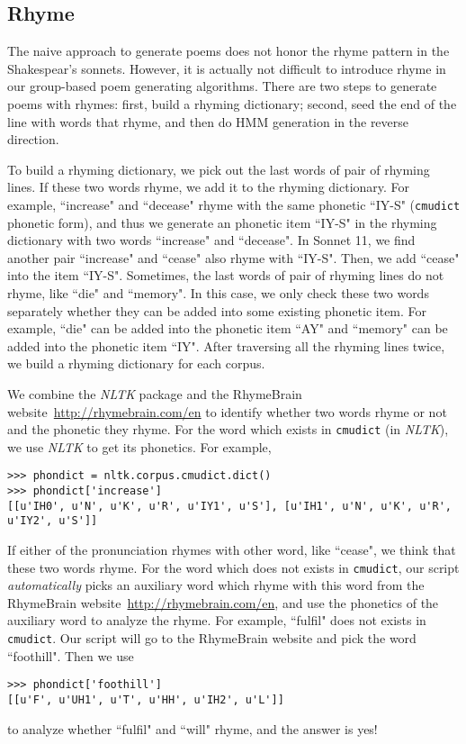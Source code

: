 %
\subsection{Rhyme}\label{sec:rhymedict}
The naive approach to generate poems does not honor the rhyme pattern in the Shakespear's sonnets. However, it is actually not difficult to introduce rhyme in our group-based poem generating algorithms. There are two steps to generate poems with rhymes: first, build a rhyming dictionary; second, seed the end of the line with words that rhyme, and then do HMM generation in the reverse direction.

To build a rhyming dictionary, we pick out the last words of pair of rhyming lines. If these two words rhyme, we add it to the rhyming dictionary. For example, ``increase" and ``decease" rhyme with the same phonetic ``IY-S" (\texttt{cmudict} phonetic form), and thus we generate an phonetic item ``IY-S" in the rhyming dictionary with two words ``increase" and ``decease". In Sonnet 11, we find another pair ``increase" and ``cease" also rhyme with ``IY-S". Then, we add ``cease" into the item ``IY-S". Sometimes, the last words of pair of rhyming lines do not rhyme, like ``die" and ``memory". In this case, we only check these two words separately whether they can be added into some existing phonetic item. For example, ``die" can be added into the phonetic item ``AY" and ``memory" can be added into the phonetic item ``IY". After traversing all the rhyming lines twice, we build a rhyming dictionary for each corpus. 

We combine the \textit{NLTK} package and the RhymeBrain website~\url{http://rhymebrain.com/en} to identify whether two words rhyme or not and the phonetic they rhyme. For the word which exists in \texttt{cmudict} (in \textit{NLTK}), we use \textit{NLTK} to get its phonetics. For example, 
\begin{lstlisting}
>>> phondict = nltk.corpus.cmudict.dict()
>>> phondict['increase']
[[u'IH0', u'N', u'K', u'R', u'IY1', u'S'], [u'IH1', u'N', u'K', u'R', u'IY2', u'S']]
\end{lstlisting}
If either of the pronunciation rhymes with other word, like ``cease", we think that these two words rhyme. For the word which does not exists in \texttt{cmudict}, our script \textit{automatically} picks an auxiliary word which rhyme with this word from the RhymeBrain website~\url{http://rhymebrain.com/en}, and use the phonetics of the auxiliary word to analyze the rhyme. For example, ``fulfil" does not exists in \texttt{cmudict}. Our script will go to the RhymeBrain website and pick the word ``foothill". Then we use 
\begin{lstlisting}
>>> phondict['foothill']
[[u'F', u'UH1', u'T', u'HH', u'IH2', u'L']]
\end{lstlisting}
to analyze whether ``fulfil" and ``will" rhyme, and the answer is yes!

